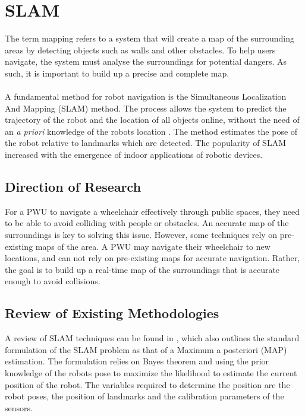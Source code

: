 \section{SLAM}
The term mapping refers to a system that will create a map of the surrounding areas by detecting objects such as walls and other obstacles. To help users navigate, the system must analyse the surroundings for potential dangers. As such, it is important to build up a precise and complete map.

\paragraph{}A fundamental method for robot navigation is the Simultaneous Localization And Mapping (SLAM) method. The process allows the system to predict the trajectory of the robot and the location of all objects online, without the need of an \textit{a priori} knowledge of the robots location \citep{Bailey2006a}. The method estimates the pose of the robot relative to landmarks which are detected. The popularity of SLAM increased with the emergence of indoor applications of robotic devices.

\subsection{Direction of Research}
For a PWU to navigate a wheelchair effectively through public spaces, they need to be able to avoid colliding with people or obstacles. An accurate map of the surroundings is key to solving this issue. However, some techniques rely on pre-existing maps of the area. A PWU may navigate their wheelchair to new locations, and can not rely on pre-existing maps for accurate navigation. Rather, the goal is to build up a real-time map of the surroundings that is accurate enough to avoid collisions.

\subsection{Review of Existing Methodologies}
A review of SLAM techniques can be found in \cite{Cadena2016}, which also outlines the standard formulation of the SLAM problem as that of a Maximum a posteriori (MAP) estimation. The formulation relies on Bayes theorem and using the prior knowledge of the robots pose to maximize the likelihood to estimate the current position of the robot. The variables required to determine the position are the robot poses, the position of landmarks and the calibration parameters of the sensors.

